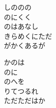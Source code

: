\documentclass[10pt,b5j]{tarticle} %
\begin{document}
\begin{enumerate}
\begin{minipage}[c]{\blocksize}
        \vspace{\linespace}
        \item
        しののの\\
        のにくく\\
        のはあなし\\
        きらめくにただ\\
        がかくあるが
        
        \vspace{\linespace}
        \item
        かのは\\
        のに\\
        のへを\\
        りてつるれ\\
        ただただはか
    
    \end{minipage}
\end{enumerate} %
\end{document}
